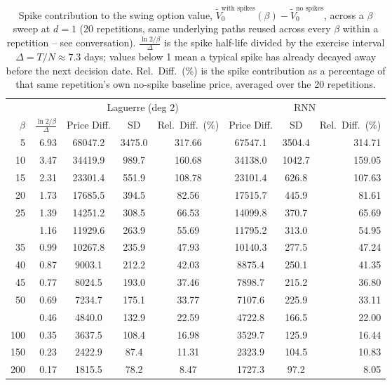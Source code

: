 \begin{table}

\caption{\label{tab:beta_spike_sensitivity}Spike contribution to the swing option value, $\tilde V_0^{\text{with spikes}}(\beta) - \tilde V_0^{\text{no spikes}}$, across a $\beta$ sweep at $d=1$ (20 repetitions, same underlying paths reused across every $\beta$ within a repetition -- see conversation). $\frac{\ln 2/\beta}{\Delta}$ is the spike half-life divided by the exercise interval $\Delta=T/N\approx7.3$ days; values below 1 mean a typical spike has already decayed away before the next decision date. Rel.\ Diff.\ (\%) is the spike contribution as a percentage of that same repetition's own no-spike baseline price, averaged over the 20 repetitions.}
\footnotesize
\setlength{\tabcolsep}{4pt}
\centering
\begin{tabular}[t]{rrcccccr}
\toprule
\multicolumn{2}{c}{ } & \multicolumn{3}{c}{Laguerre (deg 2)} & \multicolumn{3}{c}{RNN} \\
\cmidrule(l{3pt}r{3pt}){3-5} \cmidrule(l{3pt}r{3pt}){6-8}
$\beta$ & $\frac{\ln 2/\beta}{\Delta}$ & Price Diff. & SD & Rel.\ Diff.\ (\%) & Price Diff. & SD & Rel.\ Diff.\ (\%)\\
\midrule
5 & 6.93 & 68047.2 & 3475.0 & 317.66 & 67547.1 & 3504.4 & 314.71\\
10 & 3.47 & 34419.9 & 989.7 & 160.68 & 34138.0 & 1042.7 & 159.05\\
15 & 2.31 & 23301.4 & 551.9 & 108.78 & 23101.4 & 626.8 & 107.63\\
20 & 1.73 & 17685.5 & 394.5 & 82.56 & 17515.7 & 445.9 & 81.61\\
25 & 1.39 & 14251.2 & 308.5 & 66.53 & 14099.8 & 370.7 & 65.69\\
\addlinespace
30 & 1.16 & 11929.6 & 263.9 & 55.69 & 11795.2 & 313.0 & 54.95\\
35 & 0.99 & 10267.8 & 235.9 & 47.93 & 10140.3 & 277.5 & 47.24\\
40 & 0.87 & 9003.1 & 212.2 & 42.03 & 8875.4 & 250.1 & 41.35\\
45 & 0.77 & 8024.5 & 193.0 & 37.46 & 7898.7 & 215.2 & 36.80\\
50 & 0.69 & 7234.7 & 175.1 & 33.77 & 7107.6 & 225.9 & 33.11\\
\addlinespace
75 & 0.46 & 4840.0 & 132.9 & 22.59 & 4722.8 & 166.5 & 22.00\\
100 & 0.35 & 3637.5 & 108.4 & 16.98 & 3529.7 & 125.9 & 16.44\\
150 & 0.23 & 2422.9 & 87.4 & 11.31 & 2323.9 & 104.5 & 10.83\\
200 & 0.17 & 1815.5 & 78.2 & 8.47 & 1727.3 & 97.2 & 8.05\\
\bottomrule
\end{tabular}
\end{table}
